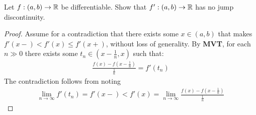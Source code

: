 \documentclass{report}
\begin{document}
\begin{question}{}{}
Let $f:(a,b)\rightarrow \mathbb{R}$ be differentiable. Show that $f':(a,b)\rightarrow \mathbb{R}$ has no jump discontinuity. 
\end{question}
\begin{proof}
Assume for a contradiction that there exists some $x \in (a,b)$ that makes $f'(x-)< f'(x) \leq f'(x+) $, without loss of generality. By \textbf{MVT}, for each $n\gg  0$ there exists some $t_n \in (x- \frac{1}{n} ,x)$ such that: 
\begin{align*}
\frac{f(x)-f(x- \frac{1}{n} )}{\frac{1}{n} } = f'(t_n)
\end{align*}
The contradiction follows from noting  
\begin{align*}
\lim_{n\to \infty} f'(t_n) =f'(x-)<f'(x)=\lim_{n\to \infty} \frac{f(x)-f(x- \frac{1}{n})}{\frac{1}{n}} 
\end{align*}
\end{proof}
\end{document}
